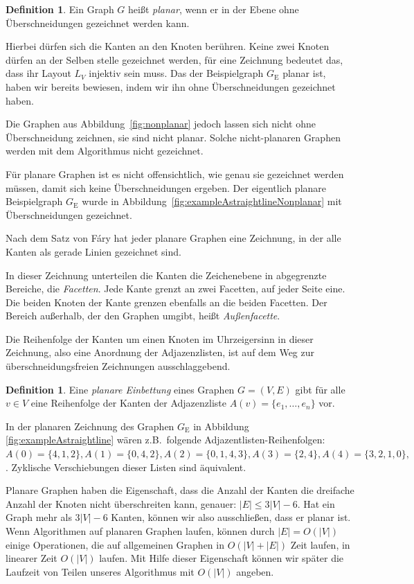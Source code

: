 \documentclass[a4paper]{scrreprt}
\theoremstyle{definition}
\newtheorem{definition}[satz]{Definition}
\begin{document}
\begin{definition}
  Ein Graph $G$ heißt \emph{planar}, wenn er in der Ebene ohne Überschneidungen gezeichnet werden kann.
\end{definition}

Hierbei dürfen sich die Kanten an den Knoten berühren. Keine zwei Knoten dürfen an der Selben stelle gezeichnet werden, für eine Zeichnung bedeutet das, dass ihr Layout $L_V$ injektiv sein muss. Das der Beispielgraph $G_\text{E}$ planar ist, haben wir bereits bewiesen, indem wir ihn ohne Überschneidungen gezeichnet haben. 

Die Graphen aus Abbildung~\ref{fig:nonplanar} jedoch lassen sich nicht ohne Überschneidung zeichnen, sie sind nicht planar. Solche nicht-planaren Graphen werden mit dem Algorithmus nicht gezeichnet. 

Für planare Graphen ist es nicht offensichtlich, wie genau sie gezeichnet werden müssen, damit sich keine Überschneidungen ergeben. Der eigentlich planare Beispielgraph $G_\text{E}$ wurde in Abbildung~\ref{fig:exampleAstraightlineNonplanar} mit Überschneidungen gezeichnet.

Nach dem Satz von Fáry hat jeder planare Graphen eine Zeichnung, in der alle Kanten als gerade Linien gezeichnet sind. %

In dieser Zeichnung unterteilen die Kanten die Zeichenebene in abgegrenzte Bereiche, die \emph{Facetten}. Jede Kante grenzt an zwei Facetten, auf jeder Seite eine. Die beiden Knoten der Kante grenzen ebenfalls an die beiden Facetten. Der Bereich außerhalb, der den Graphen umgibt, heißt \emph{Außenfacette}.

Die Reihenfolge der Kanten um einen Knoten im Uhrzeigersinn in dieser Zeichnung, also eine Anordnung der Adjazenzlisten, ist auf dem Weg zur überschneidungsfreien Zeichnungen ausschlaggebend.


\begin{definition}
  Eine \emph{planare Einbettung} eines Graphen $G = (V, E)$ gibt für alle $v \in V$ eine Reihenfolge der Kanten der Adjazenzliste $A(v) = \{e_1, \dots, e_n\}$ vor.
\end{definition}

In der planaren Zeichnung des Graphen $G_\text{E}$ in Abbildung~ \ref{fig:exampleAstraightline} wären z.B.\ folgende Adjazentlisten-Reihenfolgen: $A(0) = \{4,1,2\}, A(1) = \{0,4,2\}, A(2) = \{0,1,4,3\}, A(3) = \{2,4\}, A(4) = \{3,2,1,0\}, $. Zyklische Verschiebungen dieser Listen sind äquivalent.

Planare Graphen haben die Eigenschaft, dass die Anzahl der Kanten die dreifache Anzahl der Knoten nicht überschreiten kann, genauer: $|E| \leq 3 |V| - 6$. Hat ein Graph mehr als $3 |V| - 6$ Kanten, können wir also ausschließen, dass er planar ist. Wenn Algorithmen auf planaren Graphen laufen, können durch $|E| = O(|V|)$ einige Operationen, die auf allgemeinen Graphen in $O(|V| + |E|)$ Zeit laufen, in linearer Zeit $O(|V|)$ laufen. Mit Hilfe dieser Eigenschaft können wir später die Laufzeit von Teilen unseres Algorithmus mit $O(|V|)$ angeben.
\end{document}
